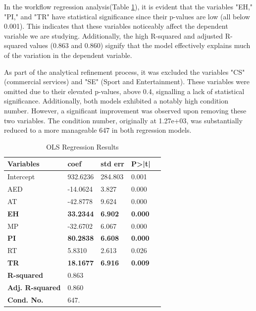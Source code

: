         In the workflow regression analysis(Table \ref{tab:ols-results}), it is evident that the variables "EH," "PI," and "TR" have statistical significance since their p-values are low (all below 0.001). This indicates that these variables noticeably affect the dependent variable we are studying. Additionally, the high R-squared and adjusted R-squared values (0.863 and 0.860) signify that the model effectively explains much of the variation in the dependent variable.

        As part of the analytical refinement process, it was excluded the variables "CS" (commercial services) and "SE" (Sport and Entertainment). These variables were omitted due to their elevated p-values, above 0.4, signalling a lack of statistical significance. Additionally, both models exhibited a notably high condition number. However, a significant improvement was observed upon removing these two variables. The condition number, originally at 1.27e+03, was substantially reduced to a more manageable 647 in both regression models. 

\begin{table}[H]
\centering
\begin{tabular}{@{}lllll@{}}
\toprule
\textbf{Variables} & \textbf{coef} & \textbf{std err} & \textbf{P>|t|} \\ \midrule
Intercept & 932.6236 & 284.803 & 0.001 \\
AED & -14.0624 & 3.827 & 0.000 \\
AT & -42.8778 & 9.624 & 0.000 \\
\color[HTML]{9A0000} \textbf{EH} & \color[HTML]{9A0000} \textbf{33.2344} & \color[HTML]{9A0000} \textbf{6.902} & \color[HTML]{9A0000} \textbf{0.000} \\
MP & -32.6702 & 6.067 & 0.000 \\
\color[HTML]{9A0000} \textbf{PI} & \color[HTML]{9A0000} \textbf{80.2838} & \color[HTML]{9A0000} \textbf{6.608} & \color[HTML]{9A0000} \textbf{0.000} \\
RT & 5.8310 & 2.613 & 0.026 \\
\color[HTML]{9A0000} \textbf{TR} & \color[HTML]{9A0000} \textbf{18.1677} & \color[HTML]{9A0000} \textbf{6.916} & \color[HTML]{9A0000} \textbf{0.009} \\ \bottomrule
\textbf{R-squared} & 0.863 \\
\textbf{Adj. R-squared} & 0.860 \\
\textbf{Cond. No.} & 647. \\ \bottomrule
\hline
\end{tabular}
\caption{OLS Regression Results}
\label{tab:ols-results}
\end{table}

